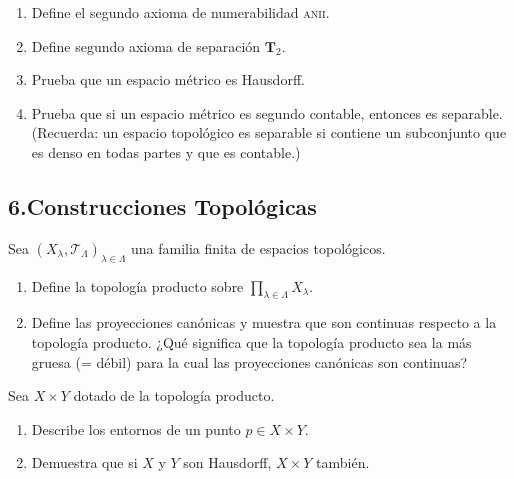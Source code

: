 \documentclass[b5paper,10pt,twoside]{book}
\begin{document}
\pagebreak

\begin{problem}\hfill
\begin{enumerate}[label=(\roman*)]
\item Define  el segundo  axioma de numerabilidad  {\scshape anii}.
\item Define segundo  axioma de separación \(\mathbf{T}_2\).
\item Prueba que un espacio métrico es  Hausdorff.
\item Prueba que si un espacio métrico es segundo contable, entonces es separable. (Recuerda: un espacio topológico es separable si contiene un subconjunto que es denso en todas partes y que es contable.)
\end{enumerate}

\end{problem}


\subsection*{6.\enspace Construcciones Topológicas}


\begin{problem}
Sea \((X_\lambda, \mathcal{T}_\Lambda)_{\lambda\in\Lambda}\)
una familia finita de espacios topológicos.
\begin{enumerate}[label=(\roman*)]
\item Define 
la topología producto sobre \(\prod\limits_{\lambda\in\Lambda} X_\lambda\).

\item Define las proyecciones canónicas y muestra que son continuas respecto a la topología producto. ¿Qué significa que la topología producto sea la más gruesa (= débil) para la cual las proyecciones canónicas son continuas?
\end{enumerate}

\end{problem}

 
\begin{problem}
Sea \(X\times Y\) dotado de la topología 
producto.
\begin{enumerate}[label=(\roman*)]
\item Describe los entornos  de un punto  \(p\in X\times Y\).
\item Demuestra que si \(X\) y \(Y\) son Hausdorff, \(X\times Y\) también.
\end{enumerate}

\end{problem}
\end{document}
